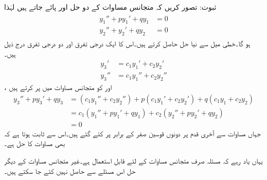 ثبوت: تصور کریں کہ متجانس مساوات  کے دو حل  اور  پائے جاتے ہیں لہٰذا
\begin{gather}
\begin{aligned}\label{مساوات_درجہ_دو_خطی_میل}
y_1''+py_1'+qy_1&=0\\
y_2''+y_2'+qy_2&=0
\end{aligned}
\end{gather}
ہو گا۔خطی میل سے نیا حل  حاصل کرتے ہیں۔اس کا ایک درجی تفرق اور دو درجی تفرق درج ذیل ہیں۔
\begin{align*}
y_3' &=c_1y_1'+c_2y_2'\\
y_3'' &=c_1 y_1''+c_2y_2''
\end{align*}
،  اور  کو متجانس مساوات میں پر کرتے ہیں
\begin{align*}
y_3''+py_3'+qy_3&=(c_1 y_1''+c_2y_2'')+p(c_1y_1'+c_2y_2')+q(c_1 y_1+c_2 y_2)\\
&=c_1(y_1''+py_1'+qy_1)+c_2(y_2''+py_2'+qy_2)\\
&=0
\end{align*}
جہاں مساوات  سے آخری قدم پر دونوں قوسین صفر کے برابر پر کئے گئے ہیں۔اس سے ثابت ہوتا ہے کہ  بھی مساوات    کا حل ہے۔

یہاں یاد رہے کہ مسئلہ  صرف متجانس مساوات کے لئے قابل استعمال ہے۔غیر متجانس مساوات کے دیگر حل اس مسئلے سے حاصل نہیں کئے جا سکتے ہیں۔

